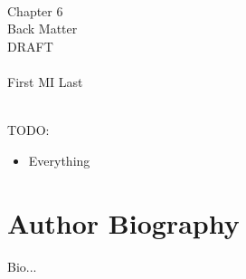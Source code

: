 \documentclass[draftthesis,fullpage,offcenter]{uiucthesis2009}
\begin{document}
		
	\backmatter
	
	\begin{center}
	~\\~\\~\\
		{\Large Chapter 6\\}
		{\LARGE Back Matter\\}
		{\Huge DRAFT\\}~\\
		{\Large First MI Last\\}
	\end{center}
	~\\
	{\Large TODO:}
	\begin{itemize}
		\item Everything
	\end{itemize}

	\newpage
\else
\fi
	
\graphicspath{{./fig_ch6/}}






\chapter{Author Biography}

Bio...

\label{ch6:end}
\ifx\IncludedFromMain\undefined
	{}
	
	
\end{document}
